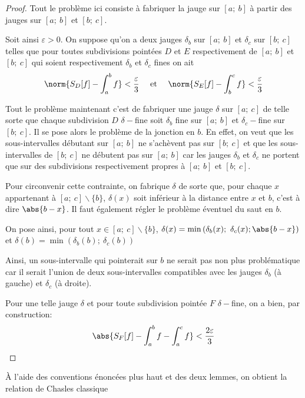 \begin{proof}
Tout le problème ici consiste à fabriquer la jauge sur $[a;~b]$ à partir des jauges sur $[a;~b]$ et $[b;~c]$.

Soit ainsi $\varepsilon>0$. On suppose qu'on a deux jauges $\delta_b$ sur $[a;~b]$ et $\delta_c$ sur $[b;~c]$ telles que
pour toutes subdivisions pointées $D$ et $E$ respectivement de $[a;~b]$ et $[b;~c]$ qui soient respectivement $\delta_b$ et $\delta_c$ fines on ait
\[
\norm{S_D[f]- \int_a^b f} < \dfrac{\varepsilon}{3} \quad \text{ et }\quad \norm{S_E[f]- \int_b^c f} < \dfrac{\varepsilon}{3}
\]

Tout le problème maintenant c'est de fabriquer une jauge $\delta$ sur $[a;~c]$ de telle sorte que chaque subdivision $D$ $\delta-$fine soit $\delta_b$ fine sur $[a;~b]$ et $\delta_c-$fine sur $[b;~c]$. Il se pose alors le problème de la jonction en $b$. En effet, on veut que les sous-intervalles débutant sur $[a;~b]$ ne s'achèvent pas sur $[b;~c]$ et que les sous-intervalles de $[b;~c]$ ne débutent pas sur $[a;~b]$ car les jauges $\delta_b$ et $\delta_c$ ne portent que sur des subdivisions respectivement propres à $[a;~b]$ et $[b;~c]$.

\medskip
Pour circonvenir cette contrainte, on fabrique $\delta$ de sorte que, pour chaque $x$ appartenant à $[a;~c] \backslash \{b\}$, $\delta(x)$ soit inférieur à la distance entre $x$ et $b$, c'est à dire $\abs{b-x}$. Il faut également régler le problème éventuel du saut en $b$.

On pose ainsi, pour tout $x \in [a;~c] \backslash \{b\}$, $\delta(x) = \min\left (\delta_b(x);~\delta_c(x);\abs{b-x}\right )$ et $\delta(b) = \min(\delta_b(b);~\delta_c(b))$

Ainsi, un sous-intervalle qui \og pointerait \fg{} sur $b$ ne serait pas non plus problématique car il serait l'union de deux sous-intervalles compatibles avec les jauges $\delta_b$ (à gauche) et $\delta_c$ (à droite).

Pour une telle jauge $\delta$ et pour toute subdivision pointée $F$ $\delta-$fine, on a bien, par construction:
\[
\abs{S_F[f]- \int_a^b f - \int_a^c f} < \dfrac{2\varepsilon}{3}
\]

\end{proof}


À l'aide des conventions énoncées plus haut et des deux lemmes, on obtient la relation de Chasles \og classique \fg{}


